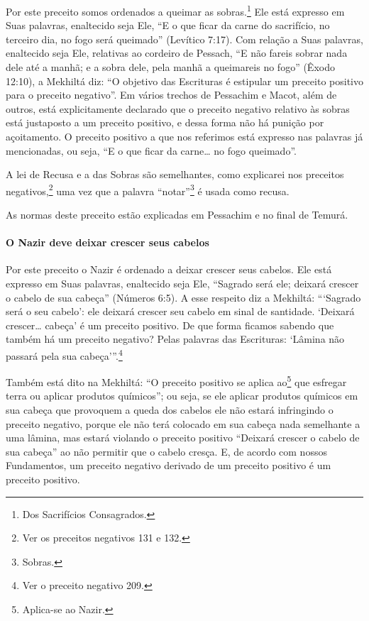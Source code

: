 Por este preceito somos ordenados a queimar as
sobras.\footnote{Dos Sacrifícios Consagrados.} Ele está expresso em Suas palavras,
enaltecido seja Ele, ``E o que ficar da carne do sacrifício, no terceiro dia, no fogo será queimado'' (Levítico 7:17). Com
relação a Suas palavras, enaltecido seja Ele, relativas ao cordeiro de
Pessach, ``E não fareis sobrar nada dele até a manhã; e a sobra
dele, pela manhã a queimareis no fogo'' (Êxodo 12:10), a Mekhiltá diz:
``O objetivo das Escrituras é estipular um preceito positivo para o
preceito negativo''. Em vários trechos de Pessachim e Macot, além de
outros, está explicitamente declarado que o preceito negativo relativo
às sobras está justaposto a um preceito positivo, e dessa forma não há
punição por açoitamento. O preceito positivo a que nos referimos está
expresso nas palavras já mencionadas, ou seja, ``E o que ficar da
carne\ldots{} no fogo queimado''.

A lei de Recusa e a das Sobras são semelhantes, como explicarei
nos preceitos negativos,\footnote{Ver os preceitos negativos 131 e 132.} uma vez que a palavra ``notar''\footnote{Sobras.} é usada como recusa.

As normas deste preceito estão explicadas em Pessachim e no final de Temurá.

\paragraph{O Nazir deve deixar crescer seus cabelos}

Por este preceito o Nazir é ordenado a deixar crescer seus cabelos. Ele
está expresso em Suas palavras, enaltecido seja Ele, ``Sagrado será ele;
deixará crescer o cabelo de sua cabeça'' (Números 6:5). A esse respeito
diz a Mekhiltá: ```Sagrado será o seu cabelo': ele deixará crescer seu
cabelo em sinal de santidade. `Deixará crescer\ldots{} cabeça' é um preceito
positivo. De que forma ficamos sabendo que também há um preceito
negativo? Pelas palavras das Escrituras: `Lâmina não passará pela sua
cabeça'''.\footnote{Ver o preceito negativo 209.}

Também está dito na Mekhiltá: ``O preceito positivo se aplica
ao\footnote{Aplica-se ao Nazir.} que esfregar terra ou aplicar produtos
químicos''; ou seja, se ele aplicar produtos químicos em sua cabeça que provoquem a queda dos cabelos ele não
estará infringindo o preceito negativo, porque ele não terá colocado em
sua cabeça nada semelhante a uma lâmina, mas estará violando o preceito
positivo ``Deixará crescer o cabelo de sua cabeça'' ao não permitir que
o cabelo cresça. E, de acordo com nossos Fundamentos, um preceito
negativo derivado de um preceito positivo é um preceito positivo.

